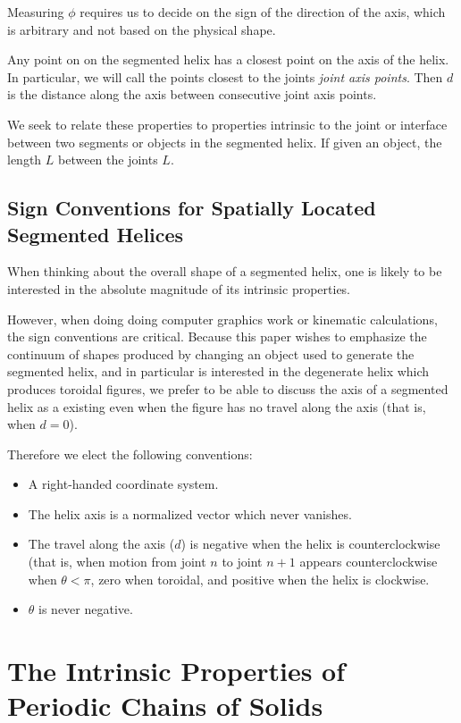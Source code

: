 \documentclass[11pt]{article}
\begin{document}
{Measuring $\phi$ requires us to decide on the sign of the direction of the axis, which is arbitrary and not based on the
physical shape.

Any point on on the segmented helix has a closest point on the axis of the helix. In particular, we will call the points closest to the
joints {\em joint axis points}. Then $d$ is the distance along the axis between consecutive joint axis points.

We seek to relate these properties to properties intrinsic to the joint or interface between
two segments or objects in the segmented helix. If given an object, the length $L$ between the joints $L$.

\label{sec:SegmentedHelix}

\subsection{Sign Conventions for Spatially Located Segmented Helices}

When thinking about the overall shape of a segmented helix, one is
likely to be interested in the absolute magnitude of its intrinsic
properties.

However, when doing doing computer graphics work or kinematic
calculations, the sign conventions are critical. Because this
paper wishes to emphasize the continuum of shapes produced by
changing an object used to generate the segmented helix, and
in particular is interested in the degenerate helix which
produces toroidal figures, we prefer to be able to discuss
the axis of a segmented helix as a existing even when the
figure has no travel along the axis (that is, when $d = 0$).

Therefore we elect the following conventions:
\begin{itemize}
\item A right-handed coordinate system.
\item The helix axis is a normalized vector
  which never vanishes.
\item The travel along the axis ($d$) is negative when
  the helix is counterclockwise (that is, when motion from
  joint $n$ to joint $n+1$ appears counterclockwise when $\theta < \pi$,
  zero when toroidal, and
  positive when the helix is clockwise.
\item $\theta$ is never negative.
\end{itemize}

\section{The Intrinsic Properties of Periodic Chains of Solids}

}
\end{document}
